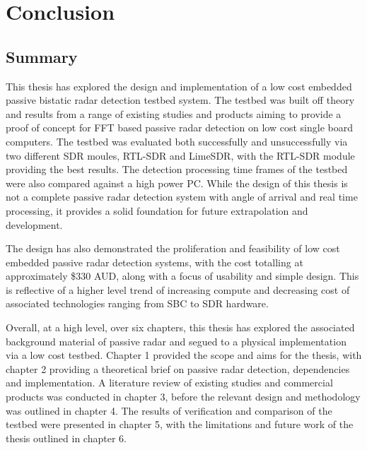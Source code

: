\chapter{Conclusion \label{sec:conclusion}}


\section{Summary \label{sec:summary}}
This thesis has explored the design and implementation of a low cost embedded passive bistatic radar detection testbed system. The testbed was built off theory and results from a range of existing studies and products aiming to provide a proof of concept for FFT based passive radar detection on low cost single board computers. The testbed was evaluated both successfully and unsuccessfully via two different SDR moules, RTL-SDR and LimeSDR, with the RTL-SDR module providing the best results. The detection processing time frames of the testbed were also compared against a high power PC. While the design of this thesis is not a complete passive radar detection system with angle of arrival and real time processing, it provides a solid foundation for future extrapolation and development. 

\par \vspace{0.2cm}
The design has also demonstrated the proliferation and feasibility of low cost embedded passive radar detection systems, with the cost totalling at approximately \$330 AUD, along with a focus of usability and simple design. This is reflective of a higher level trend of increasing compute and decreasing cost of associated technologies ranging from SBC to SDR hardware. 

\par \vspace{0.2cm}
Overall, at a high level, over six chapters, this thesis has explored the associated background material of passive radar and segued to a physical implementation via a low cost testbed. Chapter 1 provided the scope and aims for the thesis, with chapter 2 providing a theoretical brief on passive radar detection, dependencies and implementation. A literature review of existing studies and commercial products was conducted in chapter 3, before the relevant design and methodology was outlined in chapter 4. The results of verification and comparison of the testbed were presented in chapter 5, with the limitations and future work of the thesis outlined in chapter 6.

